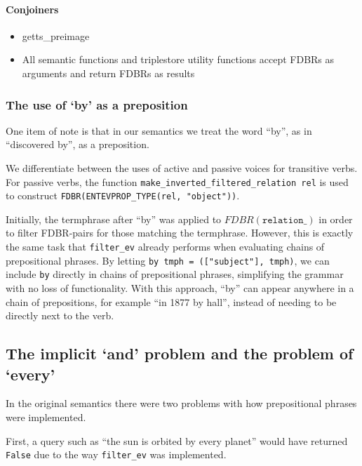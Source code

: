 \documentclass[../main.tex]{subfiles}
\begin{document}
\paragraph{Conjoiners}


\begin{itemize}
	\item getts\_preimage
	\item All semantic functions and triplestore utility functions accept FDBRs as arguments and return FDBRs as results
\end{itemize}

\subsubsection{The use of `by' as a preposition}

One item of note is that in our semantics we treat the word ``by'', as in ``discovered by'', as a preposition.

We differentiate between the uses of active and passive voices for transitive verbs.  For passive verbs, the function
\texttt{make\_inverted\_filtered\_relation rel} is used to construct \texttt{FDBR(ENTEVPROP\_TYPE(rel, "object"))}.

Initially, the termphrase after ``by'' was applied to $FDBR(\texttt{relation\_})$ in order to filter FDBR-pairs for those matching
the termphrase.  However, this is exactly the same task that \texttt{filter\_ev} already performs when evaluating chains of prepositional phrases.
By letting \texttt{by tmph = (["subject"], tmph)}, we can include \texttt{by} directly in chains of prepositional phrases, simplifying the grammar
with no loss of functionality.  With this approach, ``by'' can appear anywhere in a chain of prepositions, for example ``in 1877 by hall'', instead
of needing to be directly next to the verb.


\subsection{The implicit `and' problem and the problem of `every'}

In the original semantics there were two problems with how prepositional phrases were implemented.

First, a query such as ``the sun is orbited by every planet'' would have returned \texttt{False} due to the way \texttt{filter\_ev} was implemented.
\end{document}
